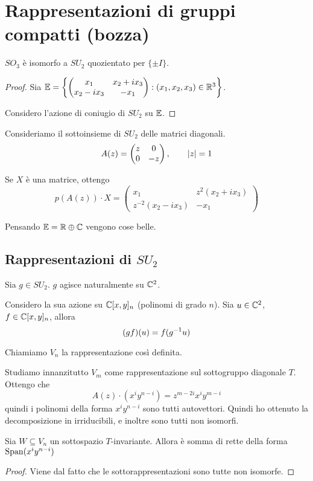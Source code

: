 \section{Rappresentazioni di gruppi compatti (bozza)}

\begin{myprop}
 $SO_3$ è isomorfo a $SU_2$ quozientato per $\{\pm I\}$.
\end{myprop}
\begin{proof}
	Sia $\mathbb E=\left\{\left(
		\begin{matrix}
			x_1	& x_2+ix_3 \\
			x_2-ix_3 & -x_1 
		\end{matrix}
	\right): (x_1,x_2,x_3) \in \mathbb R^3\right\}$.

	Considero l'azione di coniugio di $SU_2$ su $\mathbb E$. 
\end{proof}

Consideriamo il sottoinsieme di $SU_2$ delle matrici diagonali.
\[
	A(z) = \left(
		\begin{matrix}
		z & 0 \\
		0 & -z
		\end{matrix}
	\right), \qquad \left|z\right|=1
\]

Se $X$ è una matrice, ottengo
\[
	p(A(z))\cdot X = \left( 
	\begin{matrix}
		x_1 & z^2(x_2+ix_3) \\
		z^{-2}(x_2-ix_3) & -x_1
	\end{matrix}
	\right)
\]

Pensando $\mathbb E = \mathbb R \oplus \mathbb C$ vengono cose belle.

\subsection{Rappresentazioni di $SU_2$}
	Sia $g \in SU_2$. $g$ agisce naturalmente su $\mathbb C^2$.
	
	Considero la sua azione su $\mathbb C[x,y]_n$ (polinomi di grado $n$). Sia $u \in \mathbb C^2$, $f \in \mathbb C[x,y]_n$, allora 
	\[
	 (gf)(u) = f(g^{-1} u)
	\]
	
	Chiamiamo $V_n$ la rappresentazione così definita.

	Studiamo innanzitutto $V_m$ come rappresentazione sul sottogruppo diagonale $T$.
	Ottengo che 
	\[
		A(z) \cdot (x^i y^{n-i}) = z^{m-2i}x^iy^{m-i}
	\]
	quindi i polinomi della forma $x^iy^{n-i}$ sono tutti autovettori. Quindi ho ottenuto la decomposizione in irriducibili, e inoltre sono tutti non isomorfi.
	
	\begin{mylemma}
	 Sia $W\subseteq V_n$ un sottospazio $T$-invariante. Allora è somma di rette della forma $\operatorname{Span}(x^iy^{n-i})$
	\end{mylemma}
	\begin{proof}
		Viene dal fatto che le sottorappresentazioni sono tutte non isomorfe.
	\end{proof}

